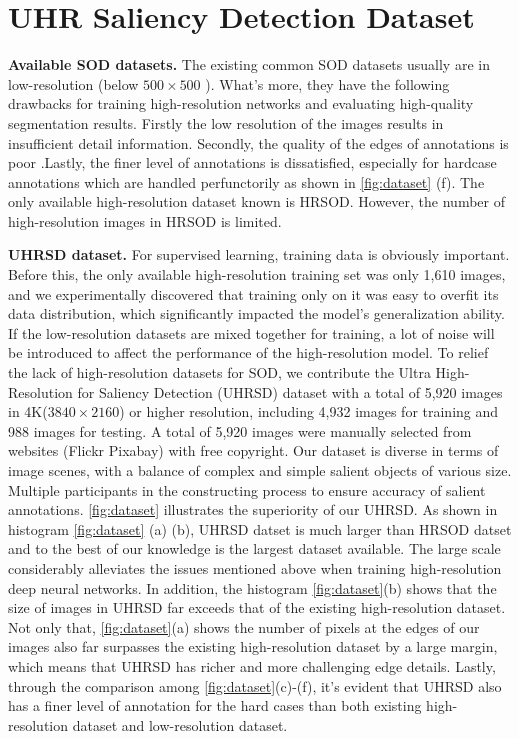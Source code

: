 \documentclass[10pt,twocolumn,letterpaper]{article}
\begin{document}
\section{UHR Saliency Detection Dataset}
\textbf{Available SOD datasets.} The existing common SOD datasets usually are in low-resolution (below $ 500 \times 500$ ). What's more, they have the following drawbacks for training high-resolution networks and evaluating high-quality segmentation results. Firstly the low resolution of the images results in insufficient detail information. Secondly, the quality of the edges of annotations is poor\cite{zeng2019towards} .Lastly, the finer level of annotations is dissatisfied, especially for hardcase annotations which are handled perfunctorily as shown in \cref{fig:dataset} (f).  The only available high-resolution dataset known is HRSOD\cite{zeng2019towards}. However, the number of high-resolution images
 in HRSOD is limited.

\textbf{UHRSD dataset.} For supervised learning, training data is obviously important. Before this, the only available high-resolution training set was only 1,610 images, and we experimentally discovered that training only on it was easy to overfit its data distribution, which significantly impacted the model's generalization ability. If the low-resolution datasets are mixed together for training, a lot of noise will be introduced to affect the performance of the high-resolution model. To relief the lack of high-resolution datasets for SOD, we contribute the Ultra High-Resolution for Saliency Detection (UHRSD) dataset with a total of 5,920 images in 4K($3840 \times 2160 $) or higher resolution, including 4,932 images for training and 988 images for testing. A total of 5,920 images were manually selected from websites (\eg Flickr Pixabay) with free copyright. Our dataset is diverse in terms of image scenes, with a balance of complex and simple salient objects of various size. Multiple participants in the constructing process to ensure accuracy of salient annotations. \cref{fig:dataset} illustrates the superiority of our UHRSD.  As shown in histogram \cref{fig:dataset} (a) (b), UHRSD datset is much larger than HRSOD datset and to the best of our knowledge is the largest dataset available. The large scale considerably alleviates the issues mentioned above when training high-resolution deep neural networks. In addition, the histogram \cref{fig:dataset}(b) shows that the size of images in UHRSD far exceeds that of the existing high-resolution dataset. Not only that, \cref{fig:dataset}(a) shows the number of pixels at the edges of our images also far surpasses the existing high-resolution dataset by a large margin, which means that UHRSD has richer and more challenging edge details. Lastly, through the comparison among \cref{fig:dataset}(c)-(f), it's evident that UHRSD also has a finer level of annotation for the hard cases than both existing high-resolution dataset and low-resolution dataset.
\end{document}
